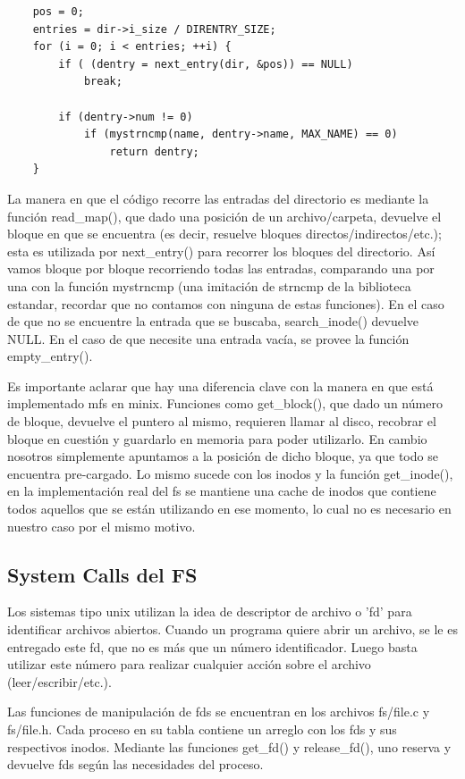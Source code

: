 \begin{verbatim}
    pos = 0;
    entries = dir->i_size / DIRENTRY_SIZE;
    for (i = 0; i < entries; ++i) {
        if ( (dentry = next_entry(dir, &pos)) == NULL)
            break;

        if (dentry->num != 0)
            if (mystrncmp(name, dentry->name, MAX_NAME) == 0)
                return dentry;
    }
\end{verbatim}

La manera en que el código recorre las entradas del directorio es mediante la
función read\_map(), que dado una posición de un archivo/carpeta, devuelve el
bloque en que se encuentra (es decir, resuelve bloques
directos/indirectos/etc.); esta es utilizada por next\_entry() para recorrer
los bloques del directorio. Así vamos bloque por bloque recorriendo
todas las entradas, comparando una por una con la función
mystrncmp (una imitación de strncmp de la biblioteca estandar, recordar que no
contamos con ninguna de estas funciones). En el caso de que no se encuentre la
entrada que se buscaba, search\_inode() devuelve NULL. En el caso de que
necesite una entrada vacía, se provee la función empty\_entry().

Es importante aclarar que hay una diferencia clave con la manera en que está
implementado mfs en minix. Funciones como get\_block(), que dado un número de
bloque, devuelve el puntero al mismo,  requieren llamar al
disco, recobrar el bloque en cuestión y guardarlo en memoria para poder
utilizarlo. En cambio nosotros simplemente apuntamos a la posición de dicho
bloque, ya que todo se encuentra pre-cargado. Lo mismo sucede con los inodos y
la función get\_inode(), en la implementación real del fs se mantiene una cache
de inodos que contiene todos aquellos que se están utilizando en ese momento,
lo cual no es necesario en nuestro caso por el mismo motivo.

\subsection{System Calls del FS}

Los sistemas tipo unix utilizan la idea de descriptor de archivo o 'fd' para
identificar archivos abiertos. Cuando un programa quiere abrir un archivo, se le
es entregado este fd, que no es más que un número identificador. Luego basta
utilizar este número para realizar cualquier acción sobre el archivo
(leer/escribir/etc.).

Las funciones de manipulación de fds se encuentran en los archivos fs/file.c y
fs/file.h. Cada proceso en su tabla contiene un arreglo con los fds y
sus respectivos inodos. Mediante las funciones get\_fd() y release\_fd(), uno
reserva y devuelve fds según las necesidades del proceso.

